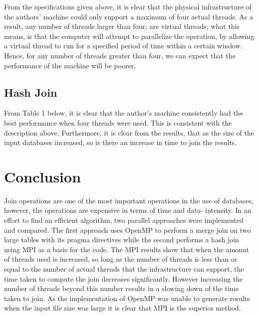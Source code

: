 \documentclass[journal,draftclsnofoot,11pt]{IEEEtran}
\begin{document}
From the specifications given above, it is clear that the physical infrastructure of the authors’ 
machine could only support a maximum of four actual threads. As a result, any number of threads larger than four, are virtual threads; what this means, is that the computer will attempt to parallelize the operation, by allowing a virtual thread to run for a specified period of time within a certain window. Hence, for any number of threads greater than four, we can expect that the performance of the machine will be poorer.

\subsection{Hash Join}
From Table 1 below, it is clear that the author’s machine consistently had the best performance when four threads were used. This is consistent with the description above. Furthermore, it is clear from the results, that as the size of the input databases increased, so is there an increase in time to join the results. 
\section{Conclusion}\label{conc}
Join operations are one of the most important operations in the use of databases, however, the operations are expensive in terms of time and data- intensity. In an effort to find an efficient algorithm, two parallel approaches were implemented and compared. The first approach uses OpenMP to perform a merge join on two large tables with its pragma directives while the second performs a hash join using MPI as a basis for the code. The MPI results show that when the amount of threads used is increased, so long as the number of threads is less than or equal to the number of actual threads that the infrastructure can support, the time taken to compute the join decreases significantly. However increasing the number of threads beyond this number results in a slowing down of the time taken to join. As the implementation of OpenMP was unable to generate results when the input file size was large it is clear that MPI is the superior method. 


\cleardoublepage
\onecolumn
\end{document}
